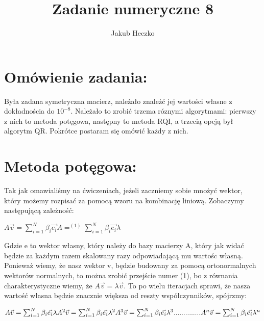 \documentclass[12pt]{article}
\begin{document}
\title{{\Large}Zadanie numeryczne 8}
\date{}
\author{Jakub Heczko}

\maketitle

\section{Omówienie zadania:}
Była zadana symetryczna macierz, należało znależć jej wartości własne z dokładnościa do ${10^{-8}}$. Należało to zrobić trzema róznymi algorytmami: pierwszy z nich to metoda potęgowa, następny to metoda RQI, a trzecią opcją był algorytm QR. Pokrótce postaram się omówić każdy z nich.
\section{Metoda potęgowa:}
Tak jak omawialiśmy na ćwiczeniach, jeżeli zaczniemy sobie mnożyć wektor, który możemy rozpisać za pomocą wzoru na kombinację liniową. Zobaczymy następującą zależność:
\begin{center}
\begin{math}
    A\vec{v} = \sum_{i=1}^{N}\beta_{i}\vec{e_{i}}A =^{(1)} \sum_{i=1}^{N}\beta_{i}\vec{e_{i}}\lambda
\end{math}
\end{center}
Gdzie e to wektor własny, który należy do bazy macierzy A, który jak widać będzie za każdym razem skalowany razy odpowiadającą mu wartośc własną. Ponieważ wiemy, że nasz wektor v, będzie budowany za pomocą ortonormalnych wektorów normalnych, to można zrobić przejście numer (1), bo z równania charakterystyczne wiemy, że $A\vec{v} =\lambda \vec{v}$. To po wielu iteracjach sprawi, że nasza wartość własna będzie znacznie większa od reszty współczynników, spójrzmy:
\begin{center}
    \begin{math}
        A\vec{v} = \sum_{i=1}^{N}\beta_{i}\vec{e_{i}}\lambda \newline
        A^{2}\vec{v} = \sum_{i=1}^{N}\beta_{i}\vec{e_{i}}\lambda^{2} \newline
        A^{3}\vec{v} = \sum_{i=1}^{N}\beta_{i}\vec{e_{i}}\lambda^{3} \newline
        ..............\newline
        A^{n}\vec{v} = \sum_{i=1}^{N}\beta_{i}\vec{e_{i}}\lambda^{n} \newline
    \end{math}
\end{center}
\end{document}

